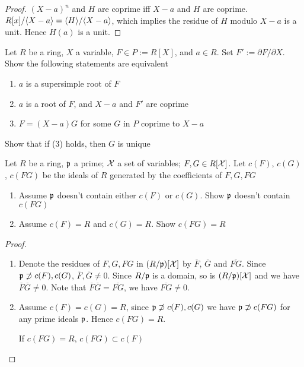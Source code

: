 \documentclass[11pt]{article}
\begin{document}
\begin{proof}
\((X-a)^n\) and \(H\) are coprime iff \(X-a\) and \(H\) are coprime.
\(R[x]/\langle X-a\rangle=\langle H\rangle/\langle X-a\rangle\), which implies the residue of \(H\)
modulo \(X-a\) is a unit. Hence \(H(a)\) is a unit.
\end{proof}

\begin{exercise}
\label{2.34}
Let \(R\) be a ring, \(X\) a variable, \(F\in P:=R[X]\), and \(a\in R\). Set
\(F':=\partial F/\partial X\). Show the following statements are equivalent
\begin{enumerate}
\item \(a\) is a supersimple root of \(F\)
\item \(a\) is a root of \(F\), and \(X-a\) and \(F'\) are coprime
\item \(F=(X-a)G\) for some \(G\) in \(P\) coprime to \(X-a\)
\end{enumerate}


Show that if (3) holds, then \(G\) is unique
\end{exercise}

\begin{exercise}
\label{2.35}
Let \(R\) be a ring, \(\mathfrak{p}\) a prime; \(\mathcal{X}\) a set of variables; \(F,G\in
   R[\mathcal{X}]\). Let \(c(F)\), \(c(G)\), \(c(FG)\) be the ideals of \(R\)
generated by the coefficients of \(F,G,FG\)
\begin{enumerate}
\item Assume \(\mathfrak{p}\) doesn't contain either \(c(F)\) or \(c(G)\). Show \(\mathfrak{p}\)
doesn't contain \(c(FG)\)
\item Assume \(c(F)=R\) and \(c(G)=R\). Show \(c(FG)=R\)
\end{enumerate}
\end{exercise}

\begin{proof}
\begin{enumerate}
\item Denote the residues of \(F,G,FG\)  in \((R/\mathfrak{p})[\mathcal{X}]\) by
\(\overbar{F}\), \(\overbar{G}\) and \(\overbar{FG}\). Since
\(\mathfrak{p}\not\supset c(F),c(G)\), \(\overbar{F},\overbar{G}\neq0\). Since
\(R/\mathfrak{p}\) is a domain, so is \((R/\mathfrak{p})[\mathcal{X}]\) and we have
\(\overbar{F}\overbar{G}\neq0\). Note that
\(\overbar{F}\overbar{G}=\overbar{FG}\), we have \(\overbar{FG}\neq0\).
\item Assume \(c(F)=c(G)=R\), since \(\mathfrak{p}\not\supset c(F),c(G)\) we have
\(\mathfrak{p}\not\supset c(FG)\) for any prime ideals \(\mathfrak{p}\). Hence \(c(FG)=R\).

If \(c(FG)=R\), \(c(FG)\subset c(F)\)
\end{enumerate}
\end{proof}
\end{document}
